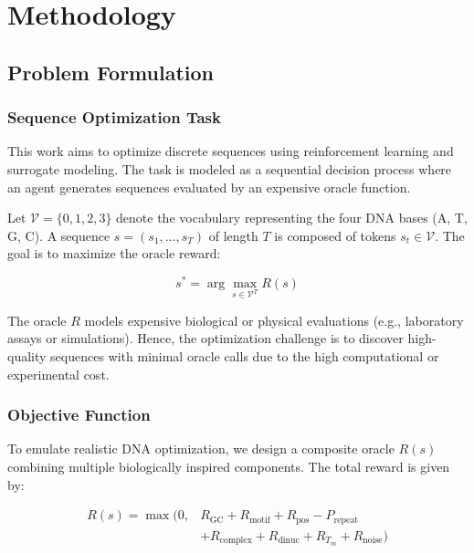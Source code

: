 \documentclass[conference]{IEEEtran}
\begin{document}
\section{Methodology}


\subsection{Problem Formulation}
\subsubsection{Sequence Optimization Task}

This work aims to optimize discrete sequences using reinforcement learning and surrogate modeling. The task is modeled as a sequential decision process where an agent generates sequences evaluated by an expensive oracle function.

Let $\mathcal{V} = \{0, 1, 2, 3\}$ denote the vocabulary representing the four DNA bases (A, T, G, C). A sequence $s = (s_1, \ldots, s_T)$ of length $T$ is composed of tokens $s_t \in \mathcal{V}$. The goal is to maximize the oracle reward:

\begin{equation}
s^* = \arg\max_{s \in \mathcal{V}^T} R(s)
\end{equation}

The oracle $R$ models expensive biological or physical evaluations (e.g., laboratory assays or simulations). Hence, the optimization challenge is to discover high-quality sequences with minimal oracle calls due to the high computational or experimental cost.

\subsubsection{Objective Function}

To emulate realistic DNA optimization, we design a composite oracle $R(s)$ combining multiple biologically inspired components. The total reward is given by:

\begin{equation}
\begin{split}
R(s) = \max\bigg(0, & R_{\text{GC}} + R_{\text{motif}} + R_{\text{pos}} - P_{\text{repeat}} \\
                   & + R_{\text{complex}} + R_{\text{dinuc}} + R_{T_m} + R_{\text{noise}}\bigg)
\end{split}
\end{equation}
\end{document}
